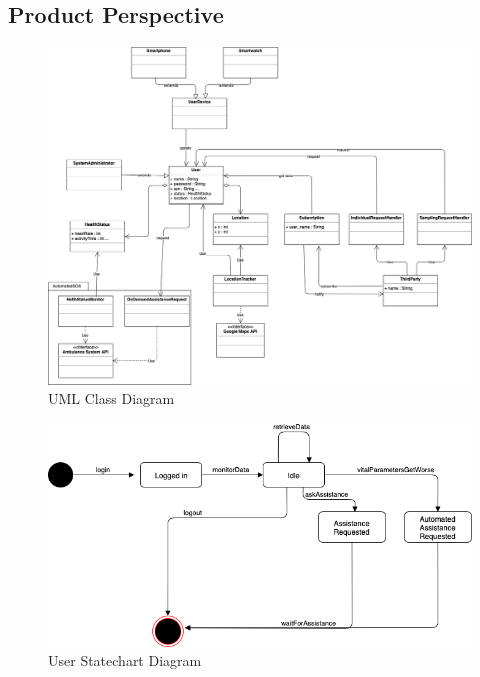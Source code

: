 \documentclass[12pt,a4paper]{article}
\begin{document}
	\subsection{Product Perspective}
		\begin{figure}[h]
			\includegraphics[width=1.25\linewidth]{Images/uml}
			\caption{UML Class Diagram}
			\label{fig:uml}
		\end{figure}
		\begin{figure}[H]
			\includegraphics[width=1.0\linewidth]{Images/statechart_user}
			\caption{User Statechart Diagram}
			\label{fig:statechart_user}
		\end{figure}
\end{document}
